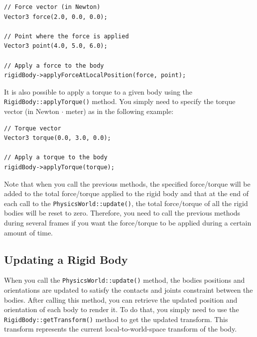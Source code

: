 \documentclass[a4paper,12pt]{article}
\begin{document}
    \begin{lstlisting}
// Force vector (in Newton)
Vector3 force(2.0, 0.0, 0.0);

// Point where the force is applied
Vector3 point(4.0, 5.0, 6.0);

// Apply a force to the body
rigidBody->applyForceAtLocalPosition(force, point);
  \end{lstlisting}

    \vspace{0.6cm}

     \begin{sloppypar}
        It is also possible to apply a torque to a given body using the \texttt{RigidBody::applyTorque()} method. You simply need to specify
	the torque vector (in Newton $\cdot$ meter) as in the following example: \\
     \end{sloppypar}

    \begin{lstlisting}
// Torque vector
Vector3 torque(0.0, 3.0, 0.0);

// Apply a torque to the body
rigidBody->applyTorque(torque);
  \end{lstlisting}

    \vspace{0.6cm}

    Note that when you call the previous methods, the specified force/torque will be added to the total force/torque applied to the rigid body and that
    at the end of each call to the \texttt{PhysicsWorld::update()}, the total force/torque of all the rigid bodies will be reset to zero.
    Therefore, you need to call the previous methods during several frames if you want the force/torque to be applied during a certain amount of time.

    \subsection{Updating a Rigid Body}

    When you call the \texttt{PhysicsWorld::update()} method, the bodies positions and orientations are updated to satisfy the contacts and joints
    constraint between the bodies. After calling this method, you can retrieve the updated position and orientation of each body to render it.
    To do that, you simply need to use the \texttt{RigidBody::getTransform()} method to get the updated transform. This transform represents the
    current local-to-world-space transform of the body. \\
\end{document}
